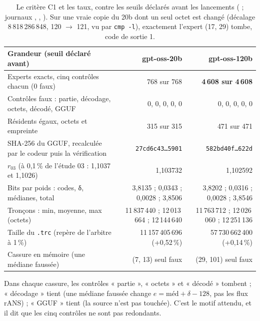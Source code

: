 \begin{table}[ht]
\centering\small
\begin{tabularx}{\linewidth}{>{\raggedright\arraybackslash}X r r}
\toprule
Grandeur (seuil déclaré avant) & gpt-oss-20b & gpt-oss-120b \\
\midrule
Experts exacts, cinq contrôles chacun (0 faux) & 768 sur 768 & \textbf{4\,608 sur 4\,608} \\
Contrôles faux : partie, décodage, octets, décodé, GGUF & 0, 0, 0, 0, 0 & 0, 0, 0, 0, 0 \\
Résidents égaux, octets et empreinte & 315 sur 315 & 471 sur 471 \\
SHA-256 du GGUF, recalculée par le codeur puis la vérification & \texttt{27cd6c43…5901} & \texttt{582bd40f…622d} \\
$r_{03}$ (à 0,1\,\% de l'étude 03 : 1,1037 et 1,1026) & 1,103732 & 1,102592 \\
Bits par poids : codes, δ, médianes, total & 3,8135 ; 0,0343 ; 0,0028 ; 3,8506 & 3,8202 ; 0,0316 ; 0,0028 ; 3,8546 \\
Tronçons : min, moyenne, max (octets) & 11\,837\,440 ; 12\,013\,664 ; 12\,144\,640 & 11\,763\,712 ; 12\,026\,060 ; 12\,251\,136 \\
Taille du \texttt{.trc} (repère de l'arbitre à 1\,\%) & 11\,157\,405\,696 (+0,52\,\%) & 57\,730\,662\,400 (+0,14\,\%) \\
Cassure en mémoire (une médiane faussée) & (7, 13) seul faux & (29, 101) seul faux \\
\bottomrule
\end{tabularx}
\caption[C1 : le verdict]{Le critère C1 et les taux, contre les seuils déclarés avant les lancements ( ; journaux , , ). Sur une vraie copie du 20b dont un seul octet est changé (décalage 8\,818\,286\,848, 120 $\to$ 121, vu par \texttt{cmp -l}), exactement l'expert (17, 29) tombe, code de sortie 1.}
\label{t2fmt:tab:cun}
\end{table}

Dans chaque cassure, les contrôles « partie », « octets » et « décodé » tombent ; « décodage » tient (une médiane faussée change $e = \text{méd} + \delta - 128$, pas les flux rANS) ; « GGUF » tient (la source n'est pas touchée). C'est le motif attendu, et il dit que les cinq contrôles ne sont pas redondants.

